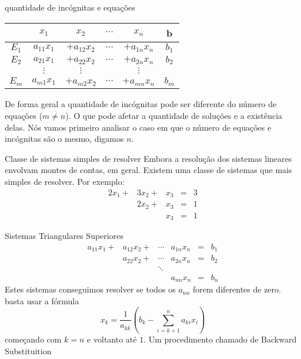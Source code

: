 \documentclass{beamer}
\begin{document}
\begin{frame}{quantidade de incógnitas e equações}
  \begin{tabular}{|c|cccc|c|} \hline 
    & $x_1$ & $x_2$ & $\cdots $ & $x_n$ & b \\ \hline
    $E_1$ & $a_{11}x_1$ & $+a_{12}x_2$ & $\cdots $ &$+a_{1n}x_n$ &$b_1$ \\
    $E_2$ & $a_{21}x_1$ & $+a_{22}x_2$& $\cdots $ &$+a_{2n}x_n $&$b_2$ \\
          &     $\vdots$       &    $\vdots$         &         & $\vdots$ &  \\
    $E_m$ & $a_{m1}x_1$ & $+a_{m2}x_2$& $\cdots $ &$+a_{mn}x_n$ &$b_m$ \\ \hline
  \end{tabular}

  De forma geral a quantidade de incógnitas pode ser diferente do número de equações ($m\neq n$).
  O que pode afetar a quantidade de soluções e a existência delas. Nós vamos primeiro analisar o caso em que
  o número de equações e incógnitas são o mesmo, digamos $n$.

\end{frame}

\begin{frame}{Classe de sistemas simples de resolver}
Embora a resolução dos sistemas lineares envolvam montes de contas, em geral. Existem uma classe de sistemas que
mais simples de resolver. Por exemplo:
$$
\begin{array}{ccccc}
  2x_1 + & 3x_2 + & x_3 & = & 3 \\
          & 2x_2 + & x_3 & = & 1 \\
          &         & x_3 & = & 1
\end{array}$$

\end{frame}


\begin{frame}{ Sistemas Triangulares Superiores}
  $$
\begin{array}{cccccc}
  a_{11}x_1 + & a_{12}x_2 + & \cdots & a_{1n}x_n & = & b_1 \\
          & a_{22}x_2 + & \cdots&a_{2n}x_n & = & b_2 \\
          &              & \ddots & & & \\
          &       &  & a_{nn}x_n & = & b_n
\end{array}$$
Estes sistemas conseguimos resolver se todos os $a_{nn}$ forem diferentes de zero. basta usar a fórmula
$$ x_k = \frac{1}{a_{kk}}(b_k - \sum_{i=k+1}^n a_{ki}x_i)$$ começando com $k=n$ e voltanto até $1$. 
Um procedimento chamado de Backward Substituition
\end{frame}
\end{document}
